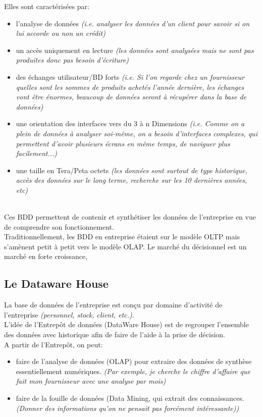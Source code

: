 \documentclass[a4paper,11pt]{article}
\begin{document}
		Elles sont caractérisées par:
		\begin{itemize}
			\item l'analyse de données \emph{(i.e. analyser les données d'un client pour savoir si on lui accorde ou non un crédit)}
			\item un accès uniquement en lecture \emph{(les données sont analysées mais ne sont pas produites donc pas besoin d'écriture)}
			\item des échanges utilisateur/BD forts \emph{(i.e. Si l'on regarde chez un fournisseur quelles sont les sommes de produits achetés l'année dernière, les échanges vont être énormes, beaucoup de données seront à récupérer dans la base de données)}
			\item une orientation des interfaces vers du 3 à n Dimensions \emph{(i.e. Comme on a plein de données à analyser soi-même, on a besoin d'interfaces complexes, qui permettent d'avoir plusieurs écrans en même temps, de naviguer plus facilement...)}
			\item une taille en Tera/Peta octets \emph{(les données sont surtout de type historique, accès des données sur le long terme, recherche sur les 10 dernières années, etc)}
		\end{itemize}
		~\\
		
		Ces BDD permettent de contenir et synthétiser les données de l'entreprise en vue de comprendre son fonctionnement.\\
		
		Traditionnellement, les BDD en entreprise étaient sur le modèle OLTP mais s'amènent petit à petit vers le modèle OLAP. Le marché du décisionnel est un marché en forte croissance, 
		
		\subsection{Le Dataware House}
		La base de données de l'entreprise est conçu par domaine d'activité de l'entreprise \emph{(personnel, stock, client, etc.)}. \\
		
		L'idée de l’Entrepôt de données (DataWare House) est de regrouper l'ensemble des données avec historique afin de faire de l'aide à la prise de décision.\\
		
		A partir de l’Entrepôt, on peut:
		\begin{itemize}
			\item faire de l'analyse de données (OLAP) pour extraire des données de synthèse essentiellement numériques. \emph{(Par exemple, je cherche le chiffre d'affaire que fait mon fournisseur avec une analyse par mois)}
			\item faire de la fouille de données (Data Mining, qui extrait des connaissances. \emph{(Donner des informations qu'on ne pensait pas forcément intéressante))}
		\end{itemize}
		
\end{document}
